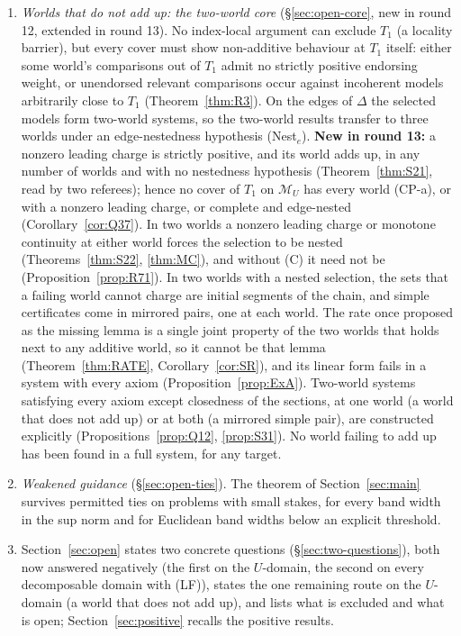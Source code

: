 \documentclass[11pt]{article}
\theoremstyle{definition}
\theoremstyle{remark}
\newcommand{\M}{\mathcal M}
\begin{document}
\begin{enumerate}[leftmargin=*]
\item \emph{Worlds that do not add up: the two-world core} (\S\ref{sec:open-core}, new in round 12, extended in round 13). No index-local argument can exclude $T_1$ (a locality barrier), but every cover must show non-additive behaviour at $T_1$ itself: either some world's comparisons out of $T_1$ admit no strictly positive endorsing weight, or unendorsed relevant comparisons occur against incoherent models arbitrarily close to $T_1$ (Theorem~\ref{thm:R3}). On the edges of $\Delta$ the selected models form two-world systems, so the two-world results transfer to three worlds under an edge-nestedness hypothesis (Nest$_e$). \textbf{New in round 13:} a nonzero leading charge is strictly positive, and its world adds up, in any number of worlds and with no nestedness hypothesis (Theorem~\ref{thm:S21}, read by two referees); hence no cover of $T_1$ on $\M_U$ has every world (CP-a), or with a nonzero leading charge, or complete and edge-nested (Corollary~\ref{cor:Q37}). In two worlds a nonzero leading charge or monotone continuity at either world forces the selection to be nested (Theorems~\ref{thm:S22}, \ref{thm:MC}), and without (C) it need not be (Proposition~\ref{prop:R71}). In two worlds with a nested selection, the sets that a failing world cannot charge are initial segments of the chain, and simple certificates come in mirrored pairs, one at each world. The rate once proposed as the missing lemma is a single joint property of the two worlds that holds next to any additive world, so it cannot be that lemma (Theorem~\ref{thm:RATE}, Corollary~\ref{cor:SR}), and its linear form fails in a system with every axiom (Proposition~\ref{prop:ExA}). Two-world systems satisfying every axiom except closedness of the sections, at one world (a world that does not add up) or at both (a mirrored simple pair), are constructed explicitly (Propositions~\ref{prop:Q12}, \ref{prop:S31}). No world failing to add up has been found in a full system, for any target.
\item \emph{Weakened guidance} (\S\ref{sec:open-ties}). The theorem of Section~\ref{sec:main} survives permitted ties on problems with small stakes, for every band width in the sup norm and for Euclidean band widths below an explicit threshold.
\item Section~\ref{sec:open} states two concrete questions (\S\ref{sec:two-questions}), both now answered negatively (the first on the $U$-domain, the second on every decomposable domain with (LF)), states the one remaining route on the $U$-domain (a world that does not add up), and lists what is excluded and what is open; Section~\ref{sec:positive} recalls the positive results.
\end{enumerate}
\end{document}
